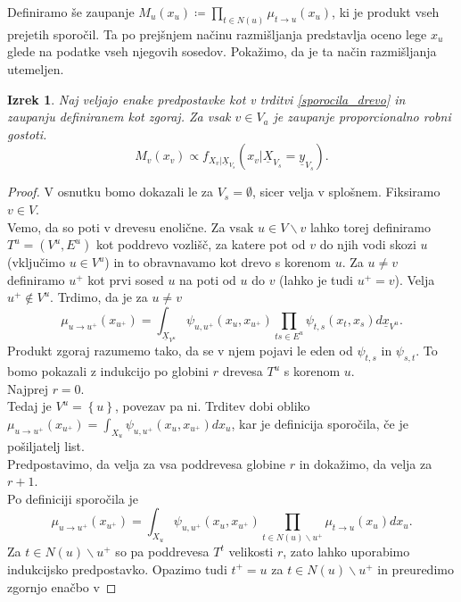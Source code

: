 \documentclass[a4paper]{article}
\newtheorem{theorem}[definition]{Izrek}
\begin{document}
	Definiramo še zaupanje
	$M_u\left(x_u\right) \coloneqq
	\prod_{t \in N\left(u\right)}\mu_{t \to u}\left(x_u\right)$,
	ki je produkt vseh prejetih sporočil. Ta po prejšnjem načinu razmišljanja
	 predstavlja oceno lege $x_u$ glede na podatke vseh
	njegovih sosedov. Pokažimo, da je ta način razmišljanja utemeljen.

	\begin{theorem}
		Naj veljajo enake predpostavke kot v trditvi \ref{sporocila_drevo} in
		zaupanju definiranem kot zgoraj.
		Za vsak $v \in V_a$ je zaupanje proporcionalno robni gostoti.
		$$
		M_v\left(x_v\right) \propto f_{X_v | \underline{X}_{V_s}}\left(x_v | \underline{X}_{V_s} = \underline{y}_{V_s}\right).
		$$
	\end{theorem}
	\begin{proof}
		V osnutku bomo dokazali le za $V_s = \emptyset$, sicer velja v splošnem.
		Fiksiramo $v \in V$.\\
		Vemo, da so poti v drevesu enolične. Za vsak $u \in V\backslash v$
		lahko torej definiramo $T^u = \left(V^u, E^u\right)$ kot poddrevo
		vozlišč, za katere pot od $v$ do njih vodi skozi $u$
		(vključimo $u \in V^u$) in to obravnavamo kot drevo s korenom $u$.
		Za $u \neq v$ definiramo $u^+$ kot prvi sosed $u$ na poti
		od $u$ do $v$ (lahko je tudi $u^+ = v$). Velja $u^+ \notin V^u$.
		Trdimo, da je za $u \neq v$
		$$\mu_{u \to u^+}\left(x_{u^+}\right) =
		\int_{\underline{X}_{V^u}} \psi_{u,u^+}\left(x_u,x_{u^+}\right) \prod_{ts \in E^u} \psi_{t, s}\left(x_t, x_s\right)d\underline{x}_{V^u}.
		$$
		Produkt zgoraj razumemo tako, da se v njem pojavi le eden od
		$\psi_{t, s}$ in $\psi_{s, t}$.
		To bomo pokazali z indukcijo po globini $r$ drevesa $T^u$ s korenom $u$.\\
		Najprej $r = 0$.\\
		Tedaj je $V^u = \left\{u\right\}$, povezav pa ni. Trditev dobi
		obliko
		$\mu_{u \to u^+}\left(x_{u^+}\right) = \int_{X_u} \psi_{u,u^+}\left(x_u,x_{u^+}\right)dx_u$,
		kar je definicija sporočila, če je pošiljatelj list.\\
		Predpostavimo, da velja za vsa poddrevesa globine $r$ in dokažimo, da
		velja za $r+1$.\\
		Po definiciji sporočila je
		$$\mu_{u \to u^+}\left(x_{u^+}\right) =
		\int_{X_u} \psi_{u,u^+}\left(x_u,x_{u^+}\right) \prod_{t\in N\left(u\right)\backslash u^+} \mu_{t \to u}\left(x_u\right)dx_u.
		$$
		Za $t\in N\left(u\right)\backslash u^+$ so pa poddrevesa $T^t$ velikosti
		$r$, zato lahko uporabimo indukcijsko predpostavko. Opazimo tudi $t^+ = u$
		za $t\in N\left(u\right)\backslash u^+$ in preuredimo zgornjo enačbo v

\end{proof}
\end{document}
